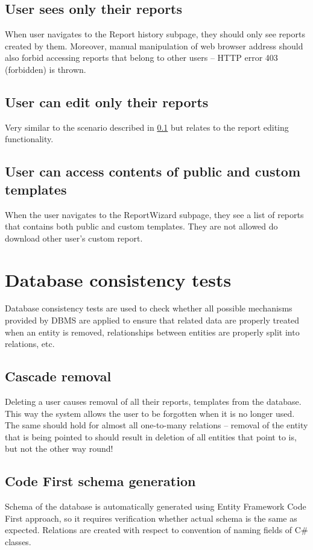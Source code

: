 \documentclass[12pt, twoside, openany]{report}
\theoremstyle{definition}
\begin{document}
\subsection{User sees only their reports}\label{report-owner}
When user navigates to the Report history subpage, they should only see reports created by them. Moreover, manual manipulation of web browser address should also forbid accessing reports that belong to other users -- HTTP error 403 (forbidden) is thrown.
\subsection{User can edit only their reports}
Very similar to the scenario described in \ref{report-owner} but relates to the report editing functionality.

\subsection{User can access contents of public and custom templates}
When the user navigates to the ReportWizard subpage, they see a list of reports that contains both public and custom templates. They are not allowed do download other user's custom report.


\section{Database consistency tests}
Database consistency tests are used to check whether all possible mechanisms provided by DBMS are applied to ensure that related data are properly treated when an entity is removed, relationships between entities are properly split into relations, etc.

\subsection{Cascade removal}
	Deleting a user causes removal of all their reports, templates from the database. This way the system allows the user to be forgotten when it is no longer used.
	The same should hold for almost all one-to-many relations – removal of the entity that is being pointed to should result in deletion of all entities that point to is, but not the other way round!

\subsection{Code First schema generation}
	Schema of the database is automatically generated using Entity Framework Code First approach, so it requires verification whether actual schema is the same as expected. 
	Relations are created with respect to convention of naming fields of C\# classes.
\end{document}
